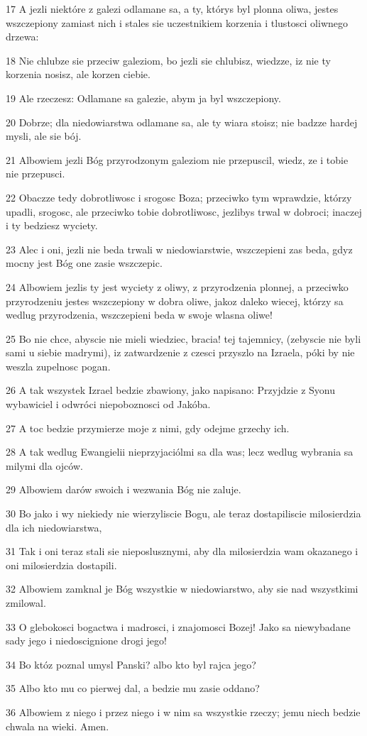 \par 17 A jezli niektóre z galezi odlamane sa, a ty, którys byl plonna oliwa, jestes wszczepiony zamiast nich i stales sie uczestnikiem korzenia i tlustosci oliwnego drzewa:
\par 18 Nie chlubze sie przeciw galeziom, bo jezli sie chlubisz, wiedzze, iz nie ty korzenia nosisz, ale korzen ciebie.
\par 19 Ale rzeczesz: Odlamane sa galezie, abym ja byl wszczepiony.
\par 20 Dobrze; dla niedowiarstwa odlamane sa, ale ty wiara stoisz; nie badzze hardej mysli, ale sie bój.
\par 21 Albowiem jezli Bóg przyrodzonym galeziom nie przepuscil, wiedz, ze i tobie nie przepusci.
\par 22 Obaczze tedy dobrotliwosc i srogosc Boza; przeciwko tym wprawdzie, którzy upadli, srogosc, ale przeciwko tobie dobrotliwosc, jezlibys trwal w dobroci; inaczej i ty bedziesz wyciety.
\par 23 Alec i oni, jezli nie beda trwali w niedowiarstwie, wszczepieni zas beda, gdyz mocny jest Bóg one zasie wszczepic.
\par 24 Albowiem jezlis ty jest wyciety z oliwy, z przyrodzenia plonnej, a przeciwko przyrodzeniu jestes wszczepiony w dobra oliwe, jakoz daleko wiecej, którzy sa wedlug przyrodzenia, wszczepieni beda w swoje wlasna oliwe!
\par 25 Bo nie chce, abyscie nie mieli wiedziec, bracia! tej tajemnicy, (zebyscie nie byli sami u siebie madrymi), iz zatwardzenie z czesci przyszlo na Izraela, póki by nie weszla zupelnosc pogan.
\par 26 A tak wszystek Izrael bedzie zbawiony, jako napisano: Przyjdzie z Syonu wybawiciel i odwróci niepoboznosci od Jakóba.
\par 27 A toc bedzie przymierze moje z nimi, gdy odejme grzechy ich.
\par 28 A tak wedlug Ewangielii nieprzyjaciólmi sa dla was; lecz wedlug wybrania sa milymi dla ojców.
\par 29 Albowiem darów swoich i wezwania Bóg nie zaluje.
\par 30 Bo jako i wy niekiedy nie wierzyliscie Bogu, ale teraz dostapiliscie milosierdzia dla ich niedowiarstwa,
\par 31 Tak i oni teraz stali sie nieposlusznymi, aby dla milosierdzia wam okazanego i oni milosierdzia dostapili.
\par 32 Albowiem zamknal je Bóg wszystkie w niedowiarstwo, aby sie nad wszystkimi zmilowal.
\par 33 O glebokosci bogactwa i madrosci, i znajomosci Bozej! Jako sa niewybadane sady jego i niedoscignione drogi jego!
\par 34 Bo któz poznal umysl Panski? albo kto byl rajca jego?
\par 35 Albo kto mu co pierwej dal, a bedzie mu zasie oddano?
\par 36 Albowiem z niego i przez niego i w nim sa wszystkie rzeczy; jemu niech bedzie chwala na wieki. Amen.

